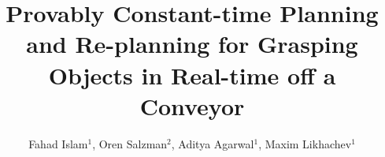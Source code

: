 \documentclass[conference]{IEEEtran}
\begin{document}
\title{Provably Constant-time Planning and Re-planning for Grasping Objects in Real-time off a Conveyor}


\author{ Fahad Islam$^{1}$,
  Oren Salzman$^{2}$,
  Aditya Agarwal$^{1}$,
  Maxim Likhachev$^{1}$\\
    }





% 
\end{document}
